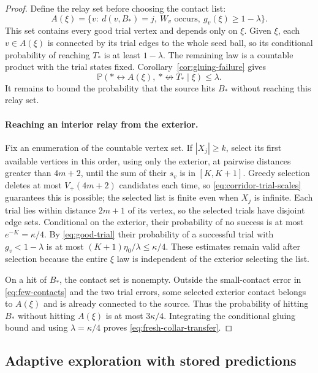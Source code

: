 \documentclass[11pt]{article}
\theoremstyle{definition}
\begin{document}
\begin{proof}
Define the relay set before choosing the contact list:
\[
 A(\xi)=\{v:\ d(v,B_*)=j,\ W_v\text{ occurs},\ g_v(\xi)\ge1-\lambda\}.
\]
This set contains every good trial vertex and depends only on $\xi$.
Given $\xi$, each $v\in A(\xi)$ is connected by its trial edges to
the whole seed ball, so its conditional probability of reaching $T_*$
is at least $1-\lambda$. The remaining law is a countable product
with the trial states fixed. Corollary~\ref{cor:gluing-failure} gives
\begin{equation*}
 \mathbb P(*\leftrightarrow A(\xi),\ *\nleftrightarrow T_*\mid\xi)
       \le\lambda.
\end{equation*}
It remains to bound the probability that the source hits $B_*$
without reaching this relay set.

\paragraph{Reaching an interior relay from the exterior.}
Fix an enumeration of the countable vertex set. If $|X_j|\ge k$,
select its first available vertices in this order, using only the
exterior, at pairwise distances greater than $4m+2$, until
the sum of their $s_v$ is in $[K,K+1]$. Greedy selection deletes at
most $V_+(4m+2)$ candidates each time, so
\eqref{eq:corridor-trial-scales} guarantees this is possible; the
selected list is finite even when $X_j$ is infinite. Each trial lies
within distance $2m+1$ of its vertex, so the selected trials have
disjoint edge sets. Conditional on the exterior, their probability
of no success is at most $e^{-K}=\kappa/4$. By
\eqref{eq:good-trial} their probability of a successful trial with
$g_v<1-\lambda$ is at most
$(K+1)\eta_0/\lambda\le\kappa/4$. These estimates remain valid
after selection because the entire $\xi$ law is independent of
the exterior selecting the list.

On a hit of $B_*$, the contact set is nonempty. Outside the small-contact
error in \eqref{eq:few-contacts} and the two trial errors, some selected
exterior contact belongs to $A(\xi)$ and is already connected to the
source. Thus the probability of hitting $B_*$ without hitting $A(\xi)$
is at most $3\kappa/4$. Integrating the conditional gluing bound and
using $\lambda=\kappa/4$ proves \eqref{eq:fresh-collar-transfer}.
\end{proof}

\subsection{Adaptive exploration with stored predictions}
\end{document}
